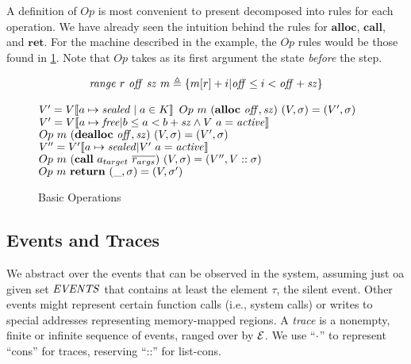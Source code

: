 \documentclass[10pt,conference]{ieeetran}%
\theoremstyle{definition}
\begin{document}
A definition of \(Op\) is most convenient to present decomposed into
rules for each operation. We have already seen the intuition behind the rules for
\(\mathbf{alloc}\), \(\mathbf{call}\), and \(\mathbf{ret}\).
For the machine described in the example, the \(Op\) rules would be those
found in \cref{fig:basicops}.
Note that \(Op\) takes as its first argument the state {\it before} the step.

\begin{figure}
    \[\mathit{range} ~ r ~ \mathit{off} ~ \mathit{sz} ~ m \triangleq
    \{m[r]+i | \mathit{off} \leq i < \mathit{off+sz}\}\]

             {\(V' = V \llbracket a \mapsto \mathit{sealed} \mid a \in K \rrbracket\)}
             {\(Op ~ m ~ (\mathbf{alloc} ~ \mathit{off, sz}) ~ (V,\sigma) = (V',\sigma)\)}
               {\(V' = V \llbracket a \mapsto \mathit{free} |
                 b \leq a < b+\mathit{sz} \land V ~ a = \mathit{active} \rrbracket\)}
               {\(Op ~ m ~ (\mathbf{dealloc} ~ \mathit{off, sz}) ~ (V,\sigma) = (V',\sigma)\)}
               {\(V'' = V'\llbracket a \mapsto \mathit{sealed} | V' ~ a = \mathit{active} \rrbracket\)}
               {\(Op ~ m ~ (\mathbf{call} ~ a_{target} ~ \overline{r_{args}})
                 ~ (V,\sigma) = (V'',V::\sigma)\)}
             {\(Op ~ m ~ \mathbf{return} ~ (\_, \sigma) = (V, \sigma')\)}
  \caption{Basic Operations}
  \label{fig:basicops}
\end{figure}

\subsection{Events and Traces}
\label{sec:events}

We abstract over the events that can be observed in the system, assuming just
oa given set \(\mathit{EVENTS}\) that contains at least the element \(\tau\), the silent
event. Other events might represent certain function calls (i.e., system calls)
or writes to special addresses representing memory-mapped regions.
A {\em trace} is a nonempty, finite or infinite sequence
of events, ranged over by \(\mathcal{E}\).
We use ``\(\cdot\)'' to represent ``cons'' for traces, reserving ``::''
for list-cons.
\end{document}
